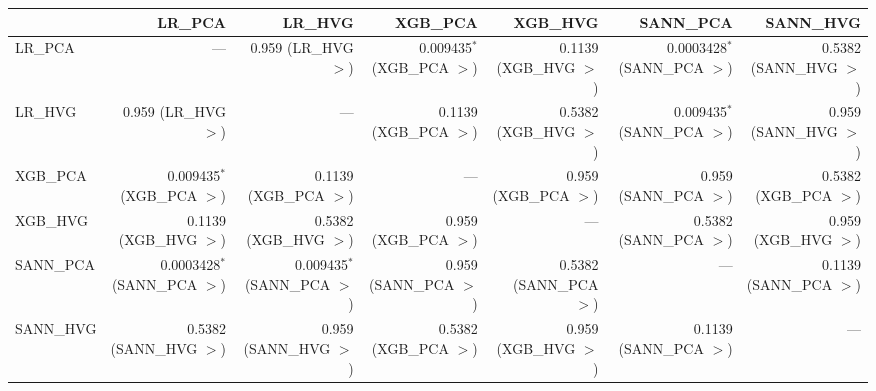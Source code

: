 \begin{tabular}{lrrrrrr}
\toprule
 & LR_PCA & LR_HVG & XGB_PCA & XGB_HVG & SANN_PCA & SANN_HVG \\
\midrule
LR_PCA & --- & 0.959 (LR_HVG $>$) & 0.009435$^{*}$ (XGB_PCA $>$) & 0.1139 (XGB_HVG $>$) & 0.0003428$^{*}$ (SANN_PCA $>$) & 0.5382 (SANN_HVG $>$) \\
LR_HVG & 0.959 (LR_HVG $>$) & --- & 0.1139 (XGB_PCA $>$) & 0.5382 (XGB_HVG $>$) & 0.009435$^{*}$ (SANN_PCA $>$) & 0.959 (SANN_HVG $>$) \\
XGB_PCA & 0.009435$^{*}$ (XGB_PCA $>$) & 0.1139 (XGB_PCA $>$) & --- & 0.959 (XGB_PCA $>$) & 0.959 (SANN_PCA $>$) & 0.5382 (XGB_PCA $>$) \\
XGB_HVG & 0.1139 (XGB_HVG $>$) & 0.5382 (XGB_HVG $>$) & 0.959 (XGB_PCA $>$) & --- & 0.5382 (SANN_PCA $>$) & 0.959 (XGB_HVG $>$) \\
SANN_PCA & 0.0003428$^{*}$ (SANN_PCA $>$) & 0.009435$^{*}$ (SANN_PCA $>$) & 0.959 (SANN_PCA $>$) & 0.5382 (SANN_PCA $>$) & --- & 0.1139 (SANN_PCA $>$) \\
SANN_HVG & 0.5382 (SANN_HVG $>$) & 0.959 (SANN_HVG $>$) & 0.5382 (XGB_PCA $>$) & 0.959 (XGB_HVG $>$) & 0.1139 (SANN_PCA $>$) & --- \\
\bottomrule
\end{tabular}